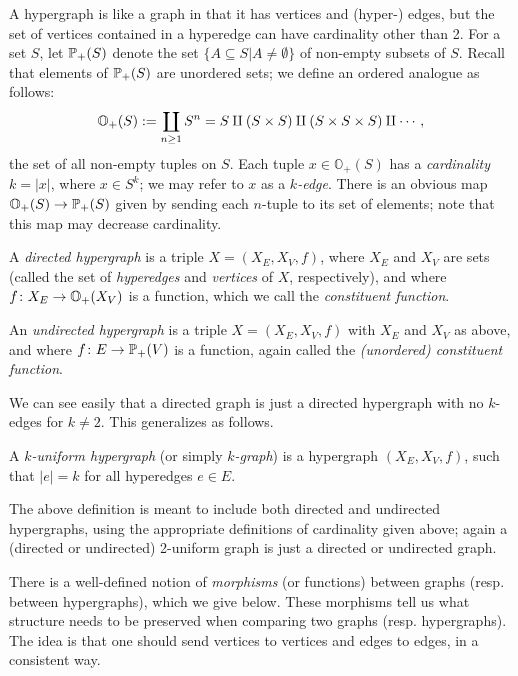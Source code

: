 \documentclass{amsart}
\def\ss{\subseteq}
\def\OO{{\mathbb O}}
\begin{document}
A hypergraph is like a graph in that it has vertices and (hyper-) edges, but the set of vertices contained in a hyperedge can have cardinality other than 2.  For a set $S$, let ${\mathbb P}_+(S)$ denote the set $\{A\ss S|A\neq\emptyset\}$ of non-empty subsets of $S$.  Recall that elements of ${\mathbb P}_+(S)$ are unordered sets; we define an ordered analogue as follows: $$\OO_+(S):=\coprod_{n\geq 1} S^n=S\amalg (S\cross S)\amalg (S\cross S\cross S)\amalg\cdots,$$ the set of all non-empty tuples on $S$.  Each tuple $x\in\OO_+(S)$ has a {\em cardinality} $k=|x|$, where $x\in S^k$; we may refer to $x$ as a {\em $k$-edge}. There is an obvious map $\OO_+(S)\to\PP_+(S)$ given by sending each $n$-tuple to its set of elements; note that this map may decrease cardinality.   

\begin{definition}

A {\em directed hypergraph} is a triple $X=(X_E,X_V,f)$, where $X_E$ and $X_V$ are sets (called the set of {\em hyperedges} and {\em vertices} of $X$, respectively), and where $f\taking X_E\to\OO_+(X_V)$ is a function, which we call the {\em constituent function}. 

An {\em undirected hypergraph} is a triple $X=(X_E,X_V,f)$ with $X_E$ and $X_V$ as above, and where $f\colon E\rightarrow{\mathbb P}_+(V)$ is a function, again called the {\em (unordered) constituent function}.

\end{definition}

We can see easily that a directed graph is just a directed hypergraph with no $k$-edges for $k\neq 2$.  This generalizes as follows. 

\begin{definition}

A {\em $k$-uniform hypergraph} (or simply {\em $k$-graph}) is a hypergraph $(X_E,X_V,f)$, such that $|e|=k$ for all hyperedges $e\in E$.

\end{definition}

The above definition is meant to include both directed and undirected hypergraphs, using the appropriate definitions of cardinality given above; again a (directed or undirected) 2-uniform graph is just a directed or undirected graph.

There is a well-defined notion of {\em morphisms} (or functions) between graphs (resp. between hypergraphs), which we give below.  These morphisms tell us what structure needs to be preserved when comparing two graphs (resp. hypergraphs).  The idea is that one should send vertices to vertices and edges to edges, in a consistent way.
\end{document}
